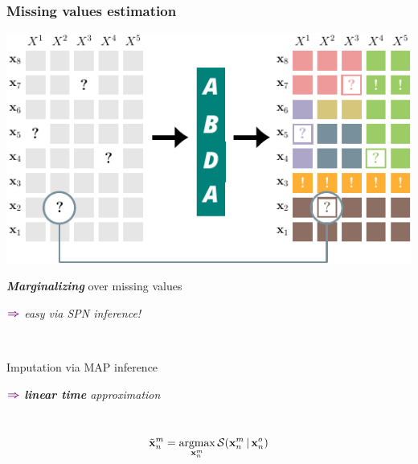 \documentclass[xcolor={usenames,dvipsnames,svgnames}, compress, aspectratio=169, 11pt]{beamer}
\newcommand{\argmax}{\operatornamewithlimits{argmax}}
\newcommand{\cndbar}{\,|\,}
\newcommand{\SPN}{\mathcal{S}}
\newcommand{\x}{\mathbf{x}}
\newcommand{\comment}[3][\small]{\begin{minipage}{1\linewidth}
          \raggedleft
          {
            $\color{violet}\boldsymbol\Rightarrow$
            #1
            {\emph{#2}}
          }
      \end{minipage}#3\\
}
\begin{document}
\begin{frame}[t, htt=bgrey2]
  \frametitle{Missing values estimation}

  \large
  \begin{minipage}[t]{0.5\linewidth}
    \vspace{10pt}
    \includegraphics[width=1.1\linewidth]{figures/abda-miss}
  \end{minipage}\hfill\begin{minipage}[t]{0.4\linewidth}
    \raggedright
    \vspace{15pt}
    \emph{\textbf{Marginalizing}} over missing values\\
    \comment{easy via SPN inference!}{}
    \vspace{18pt}

    Imputation via MAP inference\\
    \comment{\textbf{linear time} approximation}{}
    \vspace{-7pt}
    $$\tilde{\x}_{n}^{m}=\argmax_{\x_{n}^{m}}\SPN(\x_{n}^{m} \cndbar \x_{n}^{o})$$
    
  \end{minipage}  
\end{frame}
\end{document}
